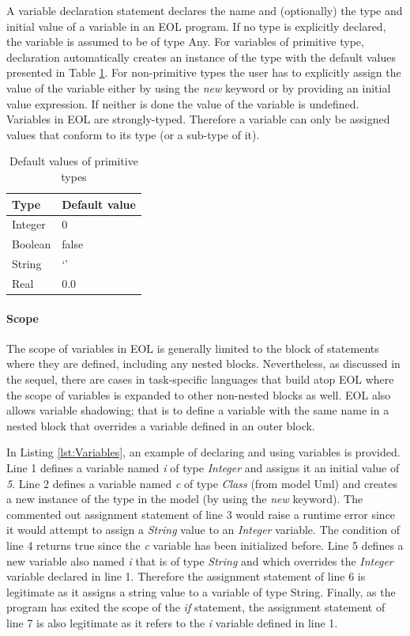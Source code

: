 A variable declaration statement declares the name and (optionally) the type and initial value of a variable in an EOL program. If no type is explicitly declared, the variable is assumed to be of type Any. For variables of primitive type, declaration automatically creates an instance of the type with the default values presented in Table \ref{tab:DefaultValuesOfPrimitiveTypes}. For non-primitive types the user has to explicitly assign the value of the variable either by using the \emph{new} keyword or by providing an initial value expression. If neither is done the value of the variable is undefined. Variables in EOL are strongly-typed. Therefore a variable can only be assigned values that conform to its type (or a sub-type of it).

\begin{longtable}{|l|l|}
	\caption{Default values of primitive types}
	\label{tab:DefaultValuesOfPrimitiveTypes}\\
			\hline
			
			\textbf{Type} &	\textbf{Default value} \\\hline
			Integer	& 0	\\\hline	   
			Boolean &	false \\\hline	
			String	& `'	\\\hline	
			Real & 0.0 \\\hline
\end{longtable}

\paragraph{Scope} The scope of variables in EOL is generally limited to the block of statements where they are defined, including any nested blocks. Nevertheless, as discussed in the sequel, there are cases in task-specific languages that build atop EOL where the scope of variables is expanded to other non-nested blocks as well. EOL also allows variable shadowing; that is to define a variable with the same name in a nested block that overrides a variable defined in an outer block. 

In Listing \ref{lst:Variables}, an example of declaring and using variables is provided. Line 1 defines a variable named \emph{i} of type \emph{Integer} and assigns it an initial value of \emph{5}. Line 2 defines a variable named \emph{c} of type \emph{Class} (from model Uml) and creates a new instance of the type in the model (by using the \emph{new} keyword). The commented out assignment statement of line 3 would raise a runtime error since it would attempt to assign a \emph{String} value to an \emph{Integer} variable. The condition of line 4 returns true since the \emph{c} variable has been initialized before. Line 5 defines a new variable also named \emph{i} that is of type \emph{String} and which overrides the \emph{Integer} variable declared in line 1. Therefore the assignment statement of line 6 is legitimate as it assigns a string value to a variable of type String. Finally, as the program has exited the scope of the \emph{if} statement, the assignment statement of line 7 is also legitimate as it refers to the \emph{i} variable defined in line 1.

